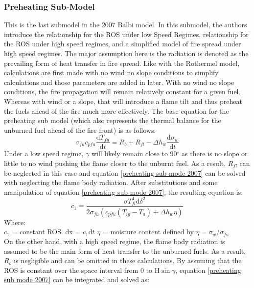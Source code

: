 \documentclass{article}
\begin{document}
\subsubsection{Preheating Sub-Model}
\indent This is the last submodel in the 2007 Balbi model. In this submodel, the authors introduce the relationship for the ROS under low Speed Regimes, relationship for the ROS under high speed regimes, and a simplified model of fire spread under high speed regimes. The major assumption here is the radiation is denoted as the prevailing form of heat transfer in fire spread. Like with the Rothermel model, calculations are first made with no wind no slope conditions to simplify calculations and those parameters are added in later. With no wind no slope conditions, the fire propagation will remain relatively constant for a given fuel. Whereas with wind or a slope, that will introduce a flame tilt and thus preheat the fuels ahead of the fire much more effectively. The base equation for the preheating sub model (which also represents the thermal balance for the unburned fuel ahead of the fire front) is as follows:
\begin{equation}
	\label{preheating sub mode 2007}
	\sigma _ {fu} c _{pfu} \frac {\mathrm{d} T_{fu}} {\mathrm{d} t} = R_b + R_{fl} - \Delta h_w \frac {\mathrm{d} \sigma _ w } {\mathrm {d} t}
\end{equation}
\indent Under a low speed regime, $\gamma$ will likely remain close to 90$^{\circ}$ as there is no slope or little to no wind pushing the flame closer to the unburnt fuel. As a result, $R_{fl}$ can be neglected in this case and equation \ref{preheating sub mode 2007} can be solved with neglecting the flame body radiation. After substitutions and some manipulation of equation \ref{preheating sub mode 2007}, the resulting equation is:
\begin{equation}
	\label{low regime ros}
	c_1 = \frac {\sigma T^{4}_{fl} \mathrm {d} \delta ^ 2} {2 \sigma _ {fu} (c_{pfu}(T_{ig} - T_a) + \Delta h _ w \eta)}
\end{equation}
Where:\\
$c_1$ = constant ROS. 
dx = $c_1 \mathrm{d}t$
$\eta$ = moisture content defined by $\eta = \sigma _ w / \sigma _ {fu}$ \\
\indent On the other hand, with a high speed regime, the flame body radiation is assumed to be the main form of heat transfer to the unburned fuels. As a result, $R_b$ is negligible and can be omitted in these calculations. By assuming that the ROS is constant over the space interval from 0 to H$\sin\gamma$, equation \ref{preheating sub mode 2007} can be integrated and solved as:
\end{document}
